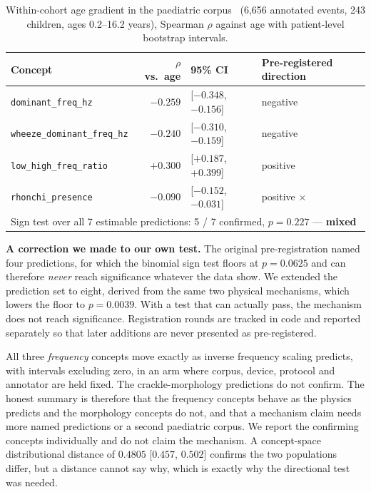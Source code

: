 \documentclass[journal,onecolumn]{IEEEtran}
\newcommand{\best}[1]{\textbf{#1}}
\begin{document}
\begin{table}[!t]
\centering
\caption{Within-cohort age gradient in the paediatric corpus~\cite{zhang2022sprsound}
(6{,}656 annotated events, 243 children, ages 0.2--16.2 years), Spearman $\rho$
against age with patient-level bootstrap intervals.}
\label{tab:pediatric}
\small
\begin{tabular}{lrll}
\toprule
Concept & $\rho$ vs.\ age & 95\% CI & Pre-registered direction \\
\midrule
\texttt{dominant\_freq\_hz}        & $-0.259$ & [$-0.348$, $-0.156$] & negative \best{\checkmark} \\
\texttt{wheeze\_dominant\_freq\_hz} & $-0.240$ & [$-0.310$, $-0.159$] & negative \best{\checkmark} \\
\texttt{low\_high\_freq\_ratio}    & $+0.300$ & [$+0.187$, $+0.399$] & positive \best{\checkmark} \\
\texttt{rhonchi\_presence}         & $-0.090$ & [$-0.152$, $-0.031$] & positive \best{$\times$} \\
\midrule
\multicolumn{4}{l}{Sign test over all 7 estimable predictions: 5 / 7 confirmed, $p = 0.227$ --- \best{mixed}} \\
\bottomrule
\end{tabular}

\vspace{2pt}
\footnotesize \textbf{A correction we made to our own test.} The original
pre-registration named four predictions, for which the binomial sign test floors
at $p = 0.0625$ and can therefore \emph{never} reach significance whatever the data
show. We extended the prediction set to eight, derived from the same two physical
mechanisms, which lowers the floor to $p = 0.0039$. With a test that can actually
pass, the mechanism does not reach significance. Registration rounds are tracked
in code and reported separately so that later additions are never presented as
pre-registered.
\end{table}

All three \emph{frequency} concepts move exactly as inverse frequency scaling
predicts, with intervals excluding zero, in an arm where corpus, device, protocol
and annotator are held fixed. The crackle-morphology predictions do not confirm.
The honest summary is therefore that the frequency concepts behave as the physics
predicts and the morphology concepts do not, and that a mechanism claim needs more
named predictions or a second paediatric corpus. We report the confirming concepts
individually and do not claim the mechanism. A concept-space distributional
distance of $0.4805$ [$0.457$, $0.502$] confirms the two populations differ, but a
distance cannot say why, which is exactly why the directional test was needed.
\end{document}
